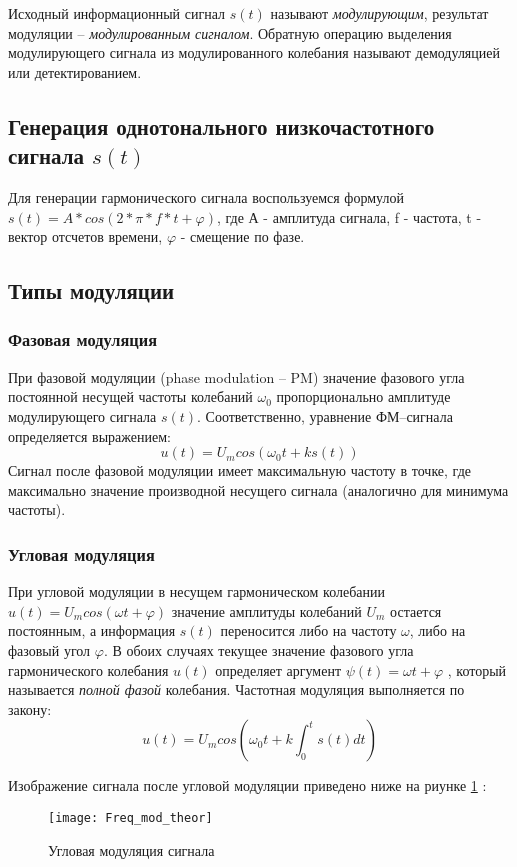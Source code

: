Исходный информационный сигнал $s(t)$ называют \textit{модулирующим}, результат модуляции    –    \textit{модулированным сигналом}. Обратную операцию выделения модулирующего сигнала из модулированного колебания называют демодуляцией или детектированием.

\subsection{Генерация однотонального низкочастотного сигнала $s(t)$}
Для генерации гармонического сигнала воспользуемся формулой $s(t) = A*cos(2*\pi * f*t + \varphi)$, где А - амплитуда сигнала, f - частота, t - вектор отсчетов времени, $\varphi$ - смещение по фазе.

\subsection{Типы модуляции}
\subsubsection{Фазовая модуляция}
При фазовой модуляции (phase modulation – PM) значение фазового угла постоянной несущей частоты колебаний $\omega_0$ пропорционально амплитуде модулирующего сигнала $s(t)$. Соответственно, уравнение ФМ–сигнала определяется выражением: 
\begin{equation}
	u(t) = U_m cos(\omega_0 t + k s(t))
\end{equation}
Сигнал после фазовой модуляции имеет максимальную частоту в точке, где максимально значение производной несущего сигнала (аналогично для минимума частоты).

\subsubsection{Угловая модуляция}
При угловой модуляции в несущем гармоническом колебании $u(t) = U_m cos(\omega t + \varphi)$  значение амплитуды колебаний $U_m$ остается постоянным, а информация $s(t)$ переносится либо на частоту $\omega$, либо на фазовый угол $\varphi$. В обоих случаях текущее значение фазового угла гармонического колебания $u(t)$ определяет аргумент $\psi (t) = \omega t + \varphi$ , который называется \textit{полной фазой} колебания.
Частотная модуляция выполняется по закону: 
\begin{equation}
	u(t) = U_m cos(\omega_0 t + k \int_{0}^{t} s(t) dt)
\end{equation}

Изображение сигнала после угловой модуляции приведено ниже на риунке \ref{pic:Freq_mod_theor} :
\begin{figure}[H]
	\begin{center}
		\texttt{[image: Freq\_mod\_theor]}
		\caption{Угловая модуляция сигнала} 
		\label{pic:Freq_mod_theor} %
	\end{center}
\end{figure}

